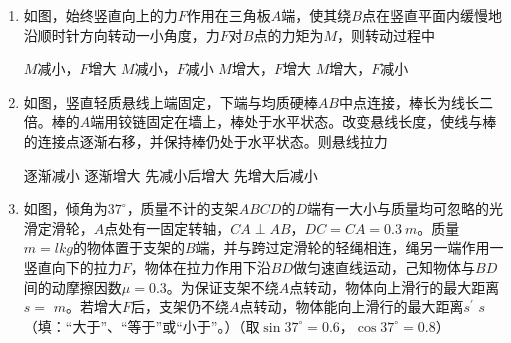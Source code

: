 \begin{enumerate}
\renewcommand{\labelenumi}{\arabic{enumi}.}
\item
{}
如图，始终竖直向上的力$ F $作用在三角板$ A $端，使其绕$ B $点在竖直平面内缓慢地沿顺时针方向转动一小角度，力$ F $对$ B $点的力矩为$ M $，则转动过程中  
\begin{figure}[h!]
\centering

\end{figure}

\fourchoices
{$ M $减小，$ F $增大}
{ $ M $减小，$ F $减小}
{$ M $增大，$ F $增大}
{$ M $增大，$ F $减小}





\item 
{}	
如图，竖直轻质悬线上端固定，下端与均质硬棒$ AB $中点连接，棒长为线长二倍。棒的$ A $端用铰链固定在墙上，棒处于水平状态。改变悬线长度，使线与棒的连接点逐渐右移，并保持棒仍处于水平状态。则悬线拉力  
\begin{figure}[h!]
\centering

\end{figure}


\fourchoices
{逐渐减小}
{逐渐增大}
{先减小后增大}
{先增大后减小}


\item 
{}
如图，倾角为$ 37 ^{ \circ } $，质量不计的支架$ ABCD $的$ D $端有一大小与质量均可忽略的光滑定滑轮，$ A $点处有一固定转轴，$ CA \perp AB $，$ DC=CA=0.3\ m $。质量$ m=lkg $的物体置于支架的$ B $端，并与跨过定滑轮的轻绳相连，绳另一端作用一竖直向下的拉力$ F $，物体在拉力作用下沿$ BD $做匀速直线运动，己知物体与$ BD $间的动摩擦因数$ \mu =0.3 $。为保证支架不绕$ A $点转动，物体向上滑行的最大距离$ s= $  $ m $。若增大$ F $后，支架仍不绕$ A $点转动，物体能向上滑行的最大距离$ s ^{\prime} $  $ s $（填：“大于”、“等于”或“小于”。）（取$ \sin 37 ^{ \circ } =0.6 $，$ \cos 37 ^{ \circ } =0.8 $）
\begin{figure}[h!]
\centering

\end{figure}


\end{enumerate}
